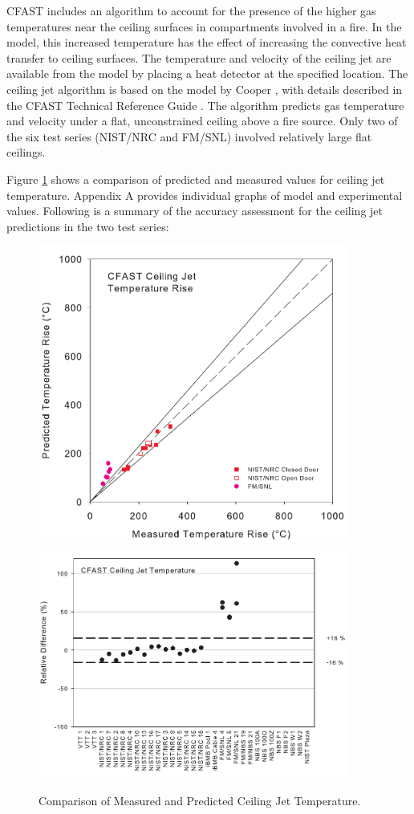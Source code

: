 CFAST includes an algorithm to account for the presence of the higher gas temperatures near the ceiling surfaces in compartments involved in a fire.  In the model, this increased temperature has the effect of increasing the convective heat transfer to ceiling surfaces.  The temperature and velocity of the ceiling jet are available from the model by placing a heat detector at the specified location.  The ceiling jet algorithm is based on the model by Cooper \cite{Cooper:1991}, with details described in the CFAST Technical Reference Guide \cite{CFAST_Tech_Guide_6}.  The algorithm predicts gas temperature and velocity under a flat, unconstrained ceiling above a fire source.  Only two of the six test series (NIST/NRC and FM/SNL) involved relatively large flat ceilings.  

Figure \ref{fig:Ceiling_Jet_Scatter} shows a comparison of predicted and measured values for ceiling jet temperature. Appendix A provides individual graphs of model and experimental values. Following is a summary of the accuracy assessment for the ceiling jet predictions in the two test series:

\begin{figure}
\begin{center}
\includegraphics[width=4.0in]{FIGURES/ScatterPlots/Ceiling_Jet_Temp}  \\
\includegraphics[width=4.0in]{FIGURES/Relative_Diff/Ceiling_Jet}
\end{center}
\caption{Comparison of Measured and Predicted Ceiling Jet Temperature.} \label{fig:Ceiling_Jet_Scatter}
\end{figure}

